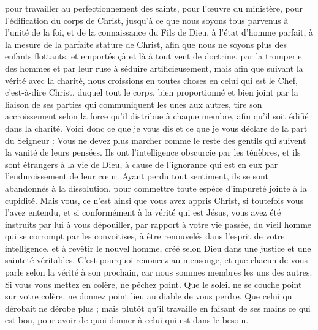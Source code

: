 \begin{multicols}{2}
pour travailler au perfectionnement des saints, pour l’œuvre du ministère, pour l'édification du corps de Christ,
jusqu'à ce que nous soyons tous parvenus à l'unité de la foi, et de la connaissance du Fils de Dieu, à l'état d'homme parfait, à la mesure de la parfaite stature de Christ,
afin que nous ne soyons plus des enfants flottants, et emportés çà et là à tout vent de doctrine, par la tromperie des hommes et par leur ruse à séduire artificieusement,
mais afin que suivant la vérité avec la charité, nous croissions en toutes choses en celui qui est le Chef, c'est-à-dire Christ,
duquel tout le corps, bien proportionné et bien joint par la liaison de ses parties qui communiquent les unes aux autres, tire son accroissement selon la force qu’il distribue à chaque membre, afin qu’il soit édifié dans la charité.
Voici donc ce que je vous dis et ce que je vous déclare de la part du Seigneur : Vous ne devez plus marcher comme le reste des gentils qui suivent la vanité de leurs pensées.
Ils ont l’intelligence obscurcie par les ténèbres, et ils sont étrangers à la vie de Dieu, à cause de l'ignorance qui est en eux par l'endurcissement de leur cœur.
Ayant perdu tout sentiment, ils se sont abandonnés à la dissolution, pour commettre toute espèce d’impureté jointe à la cupidité.
Mais vous, ce n’est ainsi que vous avez appris Christ,
si toutefois vous l'avez entendu, et si conformément à la vérité qui est Jésus, vous avez été instruits par lui à vous dépouiller,
par rapport à votre vie passée, du vieil homme qui se corrompt par les convoitises,
à être renouvelés dans l'esprit de votre intelligence,
et à revêtir le nouvel homme, créé selon Dieu dans une justice et une sainteté véritables.
C'est pourquoi renoncez au mensonge, et que chacun de vous parle selon la vérité à son prochain, car nous sommes membres les uns des autres.
Si vous vous mettez en colère, ne péchez point. Que le soleil ne se couche point sur votre colère,
ne donnez point lieu au diable de vous perdre.
Que celui qui dérobait ne dérobe plus ; mais plutôt qu’il travaille en faisant de ses mains ce qui est bon, pour avoir de quoi donner à celui qui est dans le besoin.

\end{multicols}

